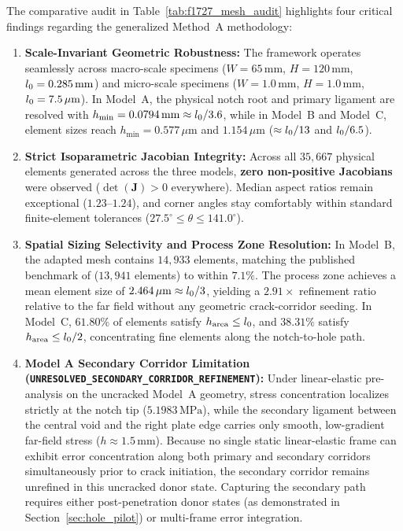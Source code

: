 The comparative audit in Table~\ref{tab:f1727_mesh_audit} highlights four critical findings regarding the generalized Method~A methodology:
\begin{enumerate}
  \item \textbf{Scale-Invariant Geometric Robustness:} The framework operates seamlessly across macro-scale specimens ($W = 65\,\mathrm{mm}$, $H = 120\,\mathrm{mm}$, $l_0 = 0.285\,\mathrm{mm}$) and micro-scale specimens ($W = 1.0\,\mathrm{mm}$, $H = 1.0\,\mathrm{mm}$, $l_0 = 7.5\,\mu\mathrm{m}$). In Model~A, the physical notch root and primary ligament are resolved with $h_{\min} = 0.0794\,\mathrm{mm} \approx l_0 / 3.6$, while in Model~B and Model~C, element sizes reach $h_{\min} = 0.577\,\mu\mathrm{m}$ and $1.154\,\mu\mathrm{m}$ ($\approx l_0 / 13$ and $l_0 / 6.5$).
  \item \textbf{Strict Isoparametric Jacobian Integrity:} Across all $35{,}667$ physical elements generated across the three models, \textbf{zero non-positive Jacobians} were observed ($\det(\mathbf{J}) > 0$ everywhere). Median aspect ratios remain exceptional ($1.23$--$1.24$), and corner angles stay comfortably within standard finite-element tolerances ($27.5^\circ \le \theta \le 141.0^\circ$).
  \item \textbf{Spatial Sizing Selectivity and Process Zone Resolution:} In Model~B, the adapted mesh contains $14{,}933$ elements, matching the published benchmark of \citet[Section~4.1]{pandey2025} ($13{,}941$ elements) to within $7.1\%$. The process zone achieves a mean element size of $2.464\,\mu\mathrm{m} \approx l_0 / 3$, yielding a $2.91\times$ refinement ratio relative to the far field without any geometric crack-corridor seeding. In Model~C, $61.80\%$ of elements satisfy $h_{\mathrm{area}} \le l_0$, and $38.31\%$ satisfy $h_{\mathrm{area}} \le l_0 / 2$, concentrating fine elements along the notch-to-hole path.
  \item \textbf{Model A Secondary Corridor Limitation (\texttt{UNRESOLVED\_SECONDARY\_CORRIDOR\_REFINEMENT}):} Under linear-elastic pre-analysis on the uncracked Model~A geometry, stress concentration localizes strictly at the notch tip ($5.1983\,\mathrm{MPa}$), while the secondary ligament between the central void and the right plate edge carries only smooth, low-gradient far-field stress ($h \approx 1.5\,\mathrm{mm}$). Because no single static linear-elastic frame can exhibit error concentration along both primary and secondary corridors simultaneously prior to crack initiation, the secondary corridor remains unrefined in this uncracked donor state. Capturing the secondary path requires either post-penetration donor states (as demonstrated in Section~\ref{sec:hole_pilot}) or multi-frame error integration.
\end{enumerate}

